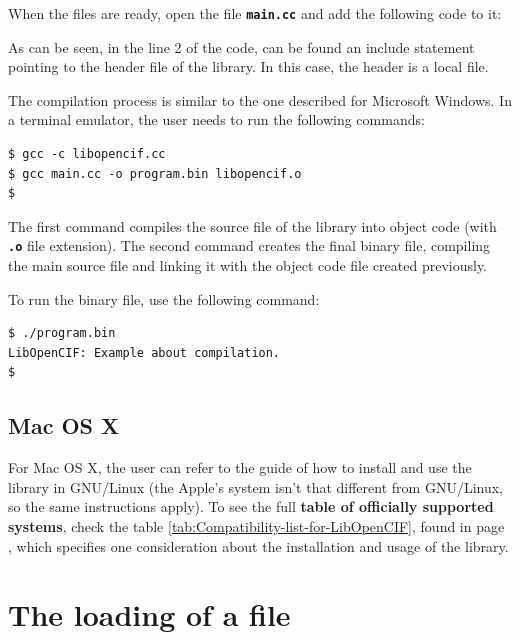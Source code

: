 \documentclass[11pt,twoside,openany,x11names,svgnames]{memoir}
\begin{document}
When the files are ready, open the file \textbf{\texttt{main.cc}} and add the following code to it:



As can be seen, in the line 2 of the code, can be found an include statement pointing to the  header file of the library. In this case, the header is a local file.

The compilation process is similar to the one described for Microsoft Windows. In a terminal emulator, the user needs to run the following commands:

\begin{lstlisting}[frame=single,style=SystemCommandStyle]
$ gcc -c libopencif.cc
$ gcc main.cc -o program.bin libopencif.o
$
\end{lstlisting}

The first command compiles the source file of the library into object code (with \textbf{\texttt{.o}} file extension). The second command creates the final binary file, compiling the main source file and linking it with the object code file created previously.

To run the binary file, use the following command:

\begin{lstlisting}[frame=single,style=SystemCommandStyle]
$ ./program.bin
LibOpenCIF: Example about compilation.
$
\end{lstlisting}

\subsection{Mac OS X}\label{Mac-OS-X}

For Mac OS X, the user can refer to the guide of how to install and use the library in GNU/Linux (the Apple's system isn't that different from GNU/Linux, so the same instructions apply). To see the full \textbf{table of officially supported systems}, check the table \ref{tab:Compatibility-list-for-LibOpenCIF}, found in page \pageref{tab:Compatibility-list-for-LibOpenCIF}, which specifies one consideration about the installation and usage of the library.

\section{The loading of a file}\label{The-loading-of-a-file}
\end{document}
